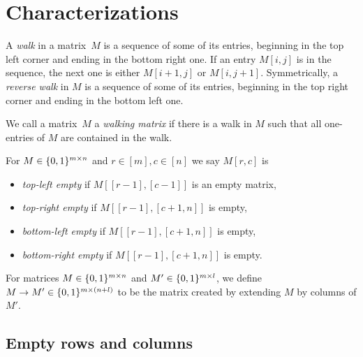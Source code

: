 \newsavebox{\smlmat}
\savebox{\smlmat}{$\smm{\bullet&\bullet\\\bullet& }$}
\newsavebox{\smlmatb}
\savebox{\smlmatb}{$\smm{\bullet&\bullet\\\bullet&\bullet}$}
\newsavebox{\smlmatc}
\savebox{\smlmatc}{$\smm{\bullet&\bullet&\bullet\\ &\bullet& }$}

\chapter{Characterizations}
\label{chap:chars}

\begin{defn}
A \emph{walk} in a matrix~$M$ is a sequence of some of its entries, beginning in the top left corner and ending in the bottom right one. If an entry $M[i,j]$ is in the sequence, the next one is either $M[i+1,j]$ or $M[i,j+1]$. Symmetrically, a \emph{reverse walk} in $M$ is a sequence of some of its entries, beginning in the top right corner and ending in the bottom left one.
\end{defn}

\begin{defn}
We call a matrix~$M$ a \emph{walking matrix} if there is a walk in $M$ such that all one-entries of $M$ are contained in the walk.
\end{defn}

\begin{defn}
For $M\in\{0,1\}^{m\times n}$ and $r\in[m],c\in[n]$ we say $M[r,c]$ is
\begin{itemize}
	\item \emph{top-left empty} if $M[[r-1],[c-1]]$ is an empty matrix,
	\item \emph{top-right empty} if $M[[r-1],[c+1,n]]$ is empty,
	\item \emph{bottom-left empty} if $M[[r-1],[c+1,n]]$ is empty,
	\item \emph{bottom-right empty} if $M[[r-1],[c+1,n]]$ is empty.
\end{itemize}
\end{defn}

\begin{defn}
For matrices $M\in\{0,1\}^{m\times n}$ and $M'\in\{0,1\}^{m\times l}$, we define $M\rightarrow M'\in\{0,1\}^{m\times(n+l)}$ to be the matrix created by extending $M$ by columns of $M'$.
\end{defn}

\section{Empty rows and columns}
\label{sec:empty}

